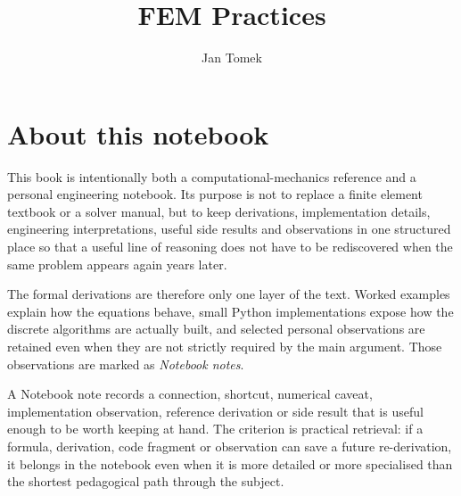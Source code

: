 \documentclass[10pt,b5paper,titlepage]{book}
\author{Jan Tomek}
\title{\bf FEM Practices}
\begin{document}
\maketitle

\chapter*{About this notebook}

This book is intentionally both a computational-mechanics reference and a
personal engineering notebook. Its purpose is not to replace a finite element
textbook or a solver manual, but to keep derivations, implementation details,
engineering interpretations, useful side results and observations in one
structured place so that a useful line of reasoning does not have to be
rediscovered when the same problem appears again years later.

The formal derivations are therefore only one layer of the text. Worked
examples explain how the equations behave, small Python implementations expose
how the discrete algorithms are actually built, and selected personal
observations are retained even when they are not strictly required by the main
argument. Those observations are marked as \textit{Notebook notes}.

\begin{notebooknote}
A Notebook note records a connection, shortcut, numerical caveat,
implementation observation, reference derivation or side result that is useful
enough to be worth keeping at hand. The criterion is practical retrieval: if a
formula, derivation, code fragment or observation can save a future
re-derivation, it belongs in the notebook even when it is more detailed or more
specialised than the shortest pedagogical path through the subject.
\end{notebooknote}

\tableofcontents















\printindex
\end{document}
